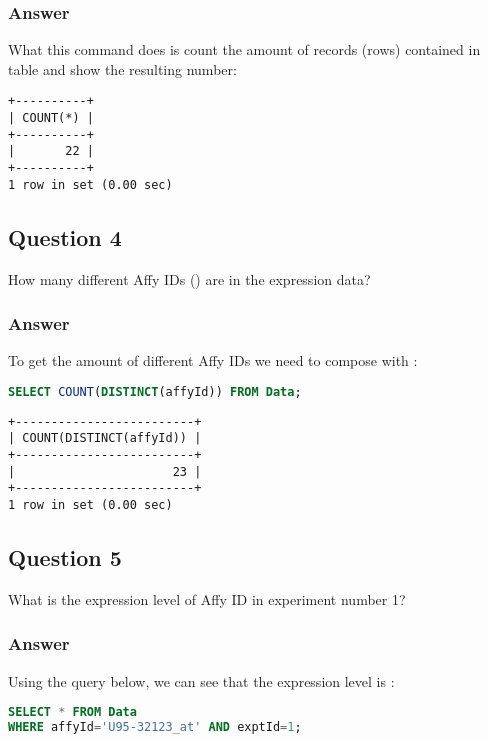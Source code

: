 \subsubsection*{Answer}
What this command does is count the amount of records (rows) contained in table  and show the resulting number:
\begin{lstlisting}[style=output]
+----------+
| COUNT(*) |
+----------+
|       22 |
+----------+
1 row in set (0.00 sec)
\end{lstlisting}

\subsection*{Question 4}
How many different Affy IDs () are in the expression data?

\subsubsection*{Answer}
To get the amount of different Affy IDs we need to compose  with :

\begin{lstlisting}[language=sql]
SELECT COUNT(DISTINCT(affyId)) FROM Data;
\end{lstlisting}

\begin{lstlisting}[style=output]
+-------------------------+
| COUNT(DISTINCT(affyId)) |
+-------------------------+
|                      23 |
+-------------------------+
1 row in set (0.00 sec)
\end{lstlisting}

\subsection*{Question 5}
What is the expression level of Affy ID  in experiment number 1?

\subsubsection*{Answer}
Using the query below, we can see that the expression level is :

\begin{lstlisting}[language=sql]
SELECT * FROM Data
WHERE affyId='U95-32123_at' AND exptId=1;
\end{lstlisting}

